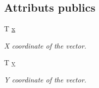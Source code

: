 \subsection*{Attributs publics}
\begin{DoxyCompactItemize}
\item 
\mbox{\label{classsf_1_1Vector2_a1e6ad77fa155f3753bfb92699bd28141}} 
T \hyperlink{classsf_1_1Vector2_a1e6ad77fa155f3753bfb92699bd28141}{x}
\begin{DoxyCompactList}\small\item\em X coordinate of the vector. \end{DoxyCompactList}\item 
\mbox{\label{classsf_1_1Vector2_a420f2481b015f4eb929c75f2af564299}} 
T \hyperlink{classsf_1_1Vector2_a420f2481b015f4eb929c75f2af564299}{y}
\begin{DoxyCompactList}\small\item\em Y coordinate of the vector. \end{DoxyCompactList}\end{DoxyCompactItemize}
